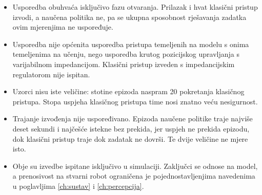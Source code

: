 \begin{itemize}
      \item Usporedba obuhvaća isključivo fazu otvaranja. Prilazak i hvat klasični pristup izvodi,
            a naučena politika ne, pa se ukupna sposobnost rješavanja zadatka ovim mjerenjima ne uspoređuje.

      \item Usporedba nije općenita usporedba pristupa temeljenih na modelu s onima temeljenima na
            učenju, nego usporedba krutog pozicijskog upravljanja s varijabilnom impedancijom.
            Klasični pristup izveden s impedancijskim regulatorom nije ispitan.

      \item Uzorci nisu iste veličine: stotine epizoda naspram 20 pokretanja klasičnog pristupa. Stopa
            uspjeha klasičnog pristupa time nosi znatno veću nesigurnost.

      \item Trajanje izvođenja nije uspoređivano. Epizoda naučene politike traje najviše deset
            sekundi i najčešće istekne bez prekida, jer uspjeh ne prekida epizodu, dok klasični
            pristup traje dok zadatak ne dovrši. Te dvije veličine ne mjere isto.

      \item Obje su izvedbe ispitane isključivo u simulaciji. Zaključci se odnose na model, a
            prenosivost na stvarni robot ograničena je pojednostavljenjima navedenima u
            poglavljima \ref{ch:sustav} i \ref{ch:percepcija}.
\end{itemize}